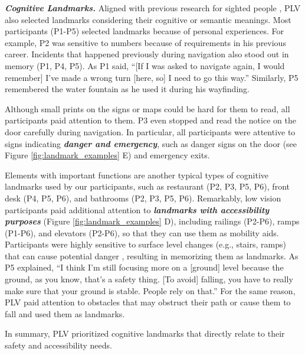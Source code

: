 \textbf{\textit{Cognitive Landmarks.}}
Aligned with previous research for sighted people \cite{yesiltepe2021landmarks}, PLV also selected landmarks considering their cognitive or semantic meanings. Most participants (P1-P5) selected landmarks because of personal experiences. For example, P2 was sensitive to numbers because of requirements in his previous career. Incidents that happened previously during navigation also stood out in memory (P1, P4, P5). As P1 said, ``[If I was asked to navigate again, I would remember] I've made a wrong turn [here, so] I need to go this way.'' Similarly, P5 remembered the water fountain as he used it during his wayfinding. 

Although small prints on the signs or maps could be hard for them to read, all participants paid attention to them. P3 even stopped and read the notice on the door carefully during navigation. In particular, all participants were attentive to signs indicating \textbf{\textit{danger and emergency}}, such as danger signs on the door (see Figure \ref{fig:landmark_examples} E) and emergency exits.

Elements with important functions are another typical types of cognitive landmarks used by our participants, such as restaurant (P2, P3, P5, P6), front desk (P4, P5, P6), and bathrooms (P2, P3, P5, P6). Remarkably, low vision participants paid additional attention to \textbf{\textit{landmarks with accessibility purposes}} (Figure \ref{fig:landmark_examples} D), including railings (P2-P6), ramps (P1-P6), and elevators (P2-P6), so that they can use them as mobility aids. Participants were highly sensitive to surface level changes (e.g., stairs, ramps) that can cause potential danger \cite{zhao2018looks}, resulting in memorizing them as landmarks. As P5 explained, ``I think I'm still focusing more on a [ground] level because the ground, as you know, that's a safety thing. [To avoid] falling, you have to really make sure that your ground is stable. People rely on that.'' %
For the same reason, PLV paid attention to obstacles that may obstruct their path or cause them to fall and used them as landmarks.

In summary, PLV prioritized cognitive landmarks that directly relate to their safety and accessibility needs.  %

